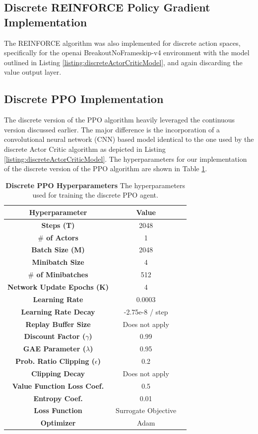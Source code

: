 \documentclass[conference]{IEEEtran}
\begin{document}
\subsection{Discrete REINFORCE Policy Gradient Implementation}
The REINFORCE algorithm was also implemented for discrete action spaces, specifically for the openai BreakoutNoFrameskip-v4 environment with the model outlined in Listing \ref{listing:discreteActorCriticModel}, and again discarding the value output layer. 

\subsection{Discrete PPO Implementation}
The discrete version of the PPO algorithm heavily leveraged the continuous version discussed earlier. The major difference is the incorporation of a convolutional neural network (CNN) based model identical to the one used by the discrete Actor Critic algorithm as depicted in Listing \ref{listing:discreteActorCriticModel}. The hyperparameters for our implementation of the discrete version of the PPO algorithm are shown in Table \ref{table:discretePPOHypers}.

\begin{table}[htbp]
    \caption{\textbf{Discrete PPO Hyperparameters}  The hyperparameters used for training the discrete PPO agent.}
\begin{center}
\begin{tabular}{|c|c|c|}
\hline
\textbf{Hyperparameter} & \textbf{Value} \\
\hline
\textbf{Steps (T)} & 2048 \\
\hline
\textbf{$\#$ of Actors} & 1 \\
\hline
\textbf{Batch Size (M)} & 2048 \\
\hline
\textbf{Minibatch Size} & 4 \\
\hline
\textbf{$\#$ of Minibatches} & 512 \\
\hline
\textbf{Network Update Epochs (K)} & 4 \\
\hline
\textbf{Learning Rate} & 0.0003 \\
\hline
\textbf{Learning Rate Decay} & -2.75e-8 / step \\
\hline
\textbf{Replay Buffer Size} & Does not apply \\
\hline
\textbf{Discount Factor ($\gamma$)} & 0.99 \\
\hline
\textbf{GAE Parameter ($\lambda$)} & 0.95 \\
\hline
\textbf{Prob. Ratio Clipping ($\epsilon$)} & 0.2\\
\hline
\textbf{Clipping Decay} & Does not apply \\
\hline
\textbf{Value Function Loss Coef.} & 0.5 \\
\hline
\textbf{Entropy Coef.} & 0.01 \\
\hline
\textbf{Loss Function} & Surrogate Objective \\
\hline
\textbf{Optimizer} & Adam \\
\hline
\end{tabular}
\label{table:discretePPOHypers}
\end{center}
\end{table}
\end{document}
